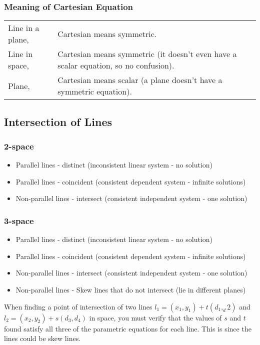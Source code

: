 \documentclass{report}
\theoremstyle{definition}
\numberwithin{equation}{section}
\begin{document}
\subsubsection{Meaning of Cartesian Equation}
\begin{tabularx}{\textwidth}{l X}
Line in a plane, & Cartesian means symmetric. \\
	Line in space, & Cartesian means symmetric (it doesn't even have a scalar equation, so no confusion). \\
	Plane, & Cartesian means scalar (a plane doesn't have a symmetric equation).
\end{tabularx}
	\subsection{Intersection of Lines}
\subsubsection{2-space}
\begin{itemize}
	\item Parallel lines - distinct (inconsistent linear system - no solution)
	\item Parallel lines - coincident (consistent dependent system - infinite solutions)
	\item Non-parallel lines - intersect (consistent independent system - one solution)
\end{itemize}
\subsubsection{3-space}
\begin{itemize}
	\item Parallel lines - distinct (inconsistent linear system - no solution)
	\item Parallel lines - coincident (consistent dependent system - infinite solutions)
	\item Non-parallel lines - intersect (consistent independent system - one solution)
	\item Non-parallel lines - Skew lines that do not intersect (lie in different planes)
\end{itemize}
When finding a point of intersection of two lines $l_1 = (x_1,y_1) + t(d_1,_d2)$ and $l_2 = (x_2,y_2) + s(d_3,d_4)$ in space, you must verify that the values of $s$ and $t$ found satisfy all three of the parametric equations for each line. This is since the lines could be skew lines.
\end{document}
